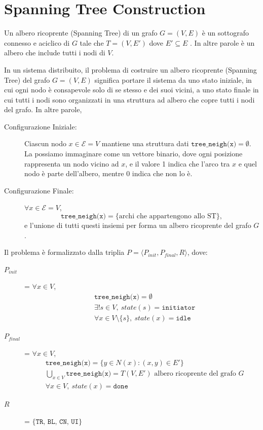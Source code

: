 \chapter{Spanning Tree Construction}

\begin{definizione}
    Un albero ricoprente (Spanning Tree) di un grafo $G = (V, E)$ è un sottografo connesso e aciclico di $G$ tale che $T = (V, E')$ dove $E' \subseteq E$ . In altre parole è un albero che include tutti i nodi di $V$.
\end{definizione}

\begin{definizione}
    In un sistema distribuito, il problema di costruire un albero ricoprente (Spanning Tree) del grafo $G = (V, E)$ significa portare il sistema da uno stato iniziale, in cui ogni nodo è consapevole solo di se stesso e dei suoi vicini, a uno stato finale in cui tutti i nodi sono organizzati in una struttura ad albero che copre tutti i nodi del grafo. In altre parole,
    \begin{description}
        \item[Configurazione Iniziale:] Ciascun nodo $x \in \mathcal{E} = V$ mantiene una struttura dati $\texttt{tree\_neigh(x)} = \emptyset$. La possiamo immaginare come un vettore binario, dove ogni posizione rappresenta un nodo vicino ad $x$, e il valore 1 indica che l'arco tra $x$ e quel nodo è parte dell'albero, mentre 0 indica che non lo è.
        \item[Configurazione Finale:] $\forall x \in \mathcal{E} = V$, 
        \[
            \texttt{tree\_neigh(x)} = \{\text{archi che appartengono allo ST}\},
        \]
        e l'unione di tutti questi insiemi per  forma un albero ricoprente del grafo $G$. 
    \end{description}
\end{definizione}

Il problema è formalizzato dalla triplia $P = \langle P_{init}, P_{final}, R \rangle$, dove:
\begin{description}
    \item[$P_{init}$] = $\forall x \in V$, 
    \begin{align*}
        &\texttt{tree\_neigh(x)} = \emptyset \\
        &\exists! s \in V,\ state(s) = \texttt{initiator} \\
        &\forall x \in V \setminus \{s\},\ state(x) = \texttt{idle}
    \end{align*}
    \item[$P_{final}$] = $\forall x \in V$, 
    \begin{align*}
        &\texttt{tree\_neigh(x)} = \{y \in N(x): (x, y) \in E'\} \\
        &\bigcup_{x \in V} \texttt{tree\_neigh(x)} = T(V, E') \text{ albero ricoprente del grafo } G \\
        &\forall x \in V,\ state(x) = \texttt{done}
    \end{align*}
    \item[$R$] = $\{\texttt{TR, BL, CN, UI}\}$
\end{description}

